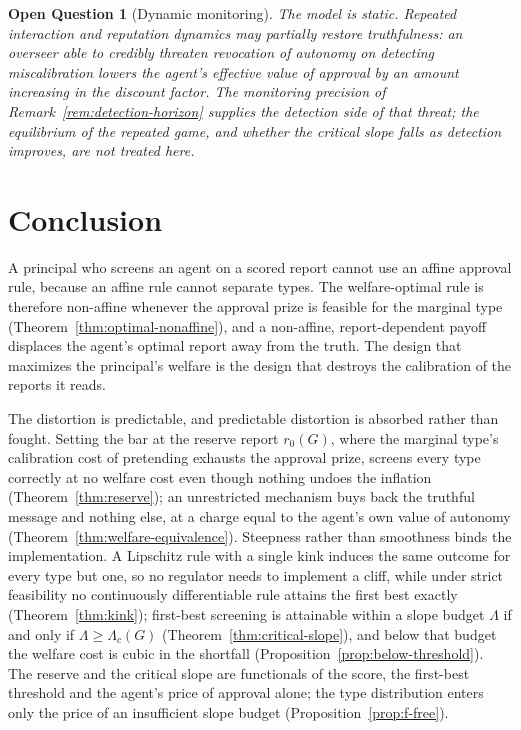 \documentclass[acmsmall,nonacm,screen]{acmart}
\theoremstyle{acmplain}%
\newtheorem{openquestion}[theorem]{Open Question}%
\theoremstyle{acmdefinition}%
\numberwithin{equation}{section}
\begin{document}
\begin{openquestion}[Dynamic monitoring]\label{oq:dynamic-monitoring}
The model is static. Repeated interaction and reputation dynamics \citep{fudenberg1989reputation} may partially restore truthfulness: an overseer able to credibly threaten revocation of autonomy on detecting miscalibration lowers the agent's effective value of approval by an amount increasing in the discount factor. The monitoring precision of Remark~\ref{rem:detection-horizon} supplies the detection side of that threat; the equilibrium of the repeated game, and whether the critical slope falls as detection improves, are not treated here.
\end{openquestion}

\section{Conclusion}\label{sec:conclusion}

A principal who screens an agent on a scored report cannot use an affine approval rule, because an affine rule cannot separate types. The welfare-optimal rule is therefore non-affine whenever the approval prize is feasible for the marginal type (Theorem~\ref{thm:optimal-nonaffine}), and a non-affine, report-dependent payoff displaces the agent's optimal report away from the truth. The design that maximizes the principal's welfare is the design that destroys the calibration of the reports it reads.

The distortion is predictable, and predictable distortion is absorbed rather than fought. Setting the bar at the reserve report $r_0(G)$, where the marginal type's calibration cost of pretending exhausts the approval prize, screens every type correctly at no welfare cost even though nothing undoes the inflation (Theorem~\ref{thm:reserve}); an unrestricted mechanism buys back the truthful message and nothing else, at a charge equal to the agent's own value of autonomy (Theorem~\ref{thm:welfare-equivalence}). Steepness rather than smoothness binds the implementation. A Lipschitz rule with a single kink induces the same outcome for every type but one, so no regulator needs to implement a cliff, while under strict feasibility no continuously differentiable rule attains the first best exactly (Theorem~\ref{thm:kink}); first-best screening is attainable within a slope budget $\Lambda$ if and only if $\Lambda \geq \Lambda_c(G)$ (Theorem~\ref{thm:critical-slope}), and below that budget the welfare cost is cubic in the shortfall (Proposition~\ref{prop:below-threshold}). The reserve and the critical slope are functionals of the score, the first-best threshold and the agent's price of approval alone; the type distribution enters only the price of an insufficient slope budget (Proposition~\ref{prop:f-free}).
\end{document}
